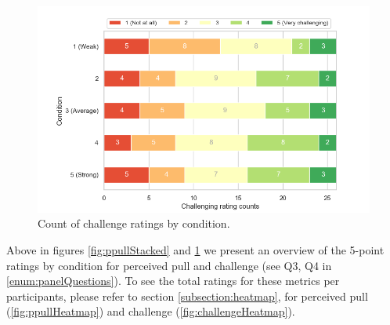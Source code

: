 \begin{figure}[H]
\captionsetup{justification=centering,margin=0.1cm}
 \centering
 \hspace{-20mm}
\includegraphics[scale=0.7]{Files/Plots/challenge_by_condition_count_staked.png}
\caption{Count of challenge ratings by condition.}
\label{fig:challengeStacked}
\end{figure}

\clearpage
Above in figures \ref{fig:ppullStacked} and 
\ref{fig:challengeStacked} we present an overview of the 5-point ratings by condition for perceived pull and challenge (see Q3, Q4 in \ref{enum:panelQuestions}). To see the total ratings for these metrics per participants, please refer to section \ref{subsection:heatmap}, for perceived pull (\ref{fig:ppullHeatmap}) and challenge (\ref{fig:challengeHeatmap}).

